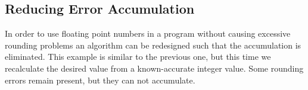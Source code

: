 \subsection{Reducing Error Accumulation}

In order to use floating point numbers in a program without causing
excessive rounding problems an algorithm can be redesigned such that the
accumulation is eliminated.
This example is similar to the previous one, but this time we recalculate the
desired value from a known-accurate integer value.
Some rounding errors remain present, but they can not accumulate.

